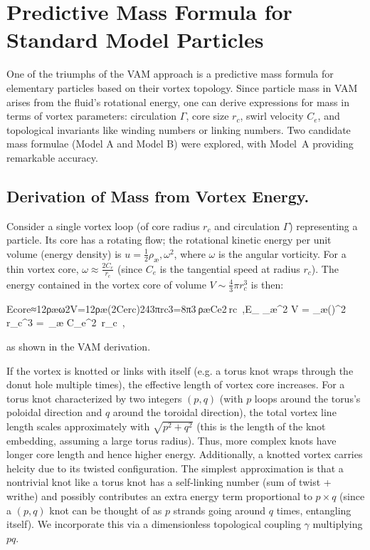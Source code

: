 \section*{Predictive Mass Formula for Standard Model Particles}

One of the triumphs of the VAM approach is a predictive mass formula for elementary particles based on their vortex topology. Since particle mass in VAM arises from the fluid’s rotational energy, one can derive expressions for mass in terms of vortex parameters: circulation $\Gamma$, core size $r_c$, swirl velocity $C_e$, and topological invariants like winding numbers or linking numbers. Two candidate mass formulae (Model A and Model B) were explored, with Model A providing remarkable accuracy.


\subsection*{Derivation of Mass from Vortex Energy.}

Consider a single vortex loop (of core radius $r_c$ and circulation $\Gamma$) representing a particle. Its core has a rotating flow; the rotational kinetic energy per unit volume (energy density) is $u = \tfrac{1}{2}\rho_{æ},\omega^2$, where $\omega$ is the angular vorticity. For a thin vortex core, $\omega \approx \frac{2 C_e}{r_c}$ (since $C_e$ is the tangential speed at radius $r_c$). The energy contained in the vortex core of volume $V \sim \frac{4}{3}\pi r_c^3$ is then:

Ecore≈12ρæω2V=12ρæ(2Cerc)243πrc3=8π3 ρæCe2 rc ,E_{} \approx {}\rho_{æ}\omega^2 V = \rho_{æ}\Big(\Big)^2 \pi r_c^3 = \,\rho_{æ} C_e^2\, r_c~,

as shown in the VAM derivation.


If the vortex is knotted or links with itself (e.g. a torus knot wraps through the donut hole multiple times), the effective length of vortex core increases. For a torus knot characterized by two integers $(p, q)$ (with $p$ loops around the torus’s poloidal direction and $q$ around the toroidal direction), the total vortex line length scales approximately with $\sqrt{p^2+q^2}$ (this is the length of the knot embedding, assuming a large torus radius). Thus, more complex knots have longer core length and hence higher energy. Additionally, a knotted vortex carries helcity due to its twisted configuration. The simplest approximation is that a nontrivial knot like a torus knot has a self-linking number (sum of twist + writhe) and possibly contributes an extra energy term proportional to $p \times q$ (since a $(p,q)$ knot can be thought of as $p$ strands going around $q$ times, entangling itself). We incorporate this via a dimensionless topological coupling $\gamma$ multiplying $p q$.


